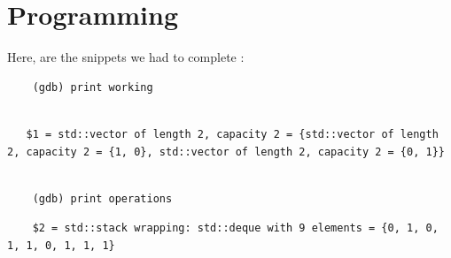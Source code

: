\documentclass[10.8pt,oneside,reqno]{article}
\begin{document}
\section{Programming}
\begin{figure}[!h]
    \begin{floatrow}
    \end{floatrow}
\end{figure}






Here, are the snippets we had to complete :  \\ 


\begin{verbatim}
    (gdb) print working
\end{verbatim}
\begin{lstlisting}

   $1 = std::vector of length 2, capacity 2 = {std::vector of length 2, capacity 2 = {1, 0}, std::vector of length 2, capacity 2 = {0, 1}}
    

\end{lstlisting}
\begin{verbatim}
    (gdb) print operations
\end{verbatim}
\begin{lstlisting}
    $2 = std::stack wrapping: std::deque with 9 elements = {0, 1, 0, 1, 1, 0, 1, 1, 1}
 \end{lstlisting}
\end{document}
